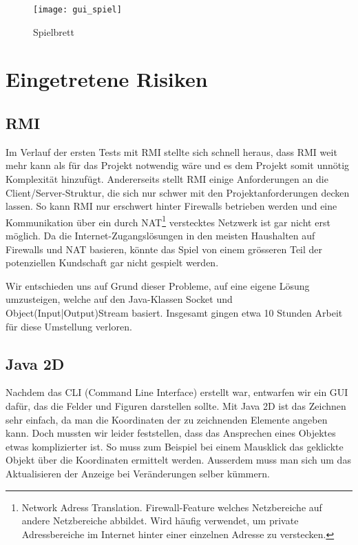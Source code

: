 \documentclass[12pt,halfparskip]{scrartcl}
\begin{document}
\begin{figure}[h]
	\centering
	\texttt{[image: gui\_spiel]}
	\caption{Spielbrett}
	\label{fig:gui_spiel}
\end{figure}


\clearpage
\section{Eingetretene Risiken} %
\label{eingetretene_risiken}

\subsection{RMI} %
\label{sub:rmi}

Im Verlauf der ersten Tests mit RMI stellte sich schnell heraus, dass RMI weit mehr kann als für das Projekt notwendig wäre und es dem Projekt somit unnötig Komplexität hinzufügt. Andererseits stellt RMI  einige Anforderungen an die Client/Server-Struktur, die sich nur schwer mit den Projektanforderungen decken lassen. So kann RMI nur erschwert hinter Firewalls betrieben werden und eine Kommunikation über ein durch NAT\footnote{Network Adress Translation. Firewall-Feature welches Netzbereiche auf andere Netzbereiche abbildet. Wird häufig verwendet, um private Adressbereiche im Internet hinter einer einzelnen Adresse zu verstecken.} verstecktes Netzwerk ist gar nicht erst möglich. Da die Internet-Zugangslösungen in den meisten Haushalten auf Firewalls und NAT basieren, könnte das Spiel von einem grösseren Teil der potenziellen Kundschaft gar nicht gespielt werden.

Wir entschieden uns auf Grund dieser Probleme, auf eine eigene Lösung umzusteigen, welche auf den Java-Klassen Socket und Object(Input|Output)Stream basiert. Insgesamt gingen etwa 10 Stunden Arbeit für diese Umstellung verloren.

\subsection{Java 2D} %
\label{java_2d}

Nachdem das CLI (Command Line Interface) erstellt war, entwarfen wir ein GUI dafür, das die Felder und Figuren darstellen sollte. Mit Java 2D ist das Zeichnen sehr einfach, da man die Koordinaten der zu zeichnenden Elemente angeben kann. Doch mussten wir leider feststellen, dass das Ansprechen eines Objektes etwas komplizierter ist. So muss zum Beispiel bei einem Mausklick das geklickte Objekt über die Koordinaten ermittelt werden. Ausserdem muss man sich um das Aktualisieren der Anzeige bei Veränderungen selber kümmern.
\end{document}
